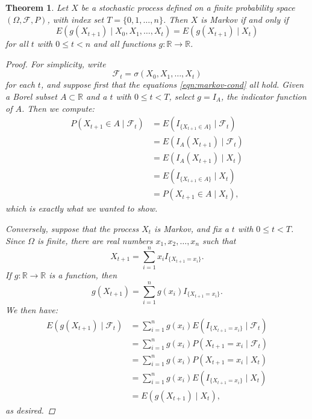 \documentclass[11pt]{book}
\newtheorem{thm}{Theorem}[section]
\theoremstyle{definition}
\numberwithin{equation}{section}
\begin{document}
\begin{thm}
	Let $X$ be a stochastic process defined on a finite probability space $(\Omega, \mathcal{F}, P)$, with index set $T = \{0,1,\ldots,n\}$. Then $X$ is Markov if and only if
	\begin{equation}\label{eqn:markov-cond}
		E\left(g(X_{t+1}) \mid X_0, X_1,\ldots,X_t\right) = E \left( g(X_{t+1}) \mid X_t \right)
	\end{equation}
	for all $t$ with $0\leq t < n$ and all functions $g: \mathbb{R} \to \mathbb{R}$.
	\begin{proof}
		For simplicity, write
		\[
			\mathcal{F}_t = \sigma\left(X_0,X_1,\ldots,X_t \right)
		\]
		for each $t$, and suppose first that the equations \eqref{eqn:markov-cond} all hold. Given a Borel subset $A\subset \mathbb{R}$ and a $t$ with $0\leq t < T$, select $g=I_A$, the indicator function of $A$. Then we compute:
		\begin{align*}
			P\left(X_{t+1} \in A \mid \mathcal{F}_t\right) & = E\left( I_{\{X_{t+1} \in A\}} \mid \mathcal{F}_t \right) \\
			                                               & = E \left( I_A(X_{t+1}) \mid \mathcal{F}_t \right)         \\
			                                               & = E \left( I_A(X_{t+1}) \mid X_t \right)                   \\
			                                               & = E \left( I_{\{X_{t+1} \in A\}} \mid X_t \right)          \\
			                                               & = P\left(X_{t+1} \in A \mid X_t\right),
		\end{align*}
		which is exactly what we wanted to show.

		Conversely, suppose that the process $X_t$ is Markov, and fix a $t$ with $0 \leq t < T$. Since $\Omega$ is finite, there are real numbers $x_1,x_2,\ldots,x_n$ such that
		\[
			X_{t+1} = \sum_{i=1}^n x_i I_{\{X_{t+1} = x_i \}}.
		\]
		If $g: \mathbb{R} \to \mathbb{R}$ is a function, then
		\[
			g(X_{t+1}) = \sum_{i=1}^n g(x_i) I_{\{X_{t+1} = x_i \}}.
		\]
		We then have:
		\begin{align*}
			E \left( g(X_{t+1}) \mid \mathcal{F}_t \right) & = \sum_{i=1}^n g(x_i) E\left(I_{\{X_{t+1} = x_i \}} \mid \mathcal{F}_t \right) \\
			                                               & = \sum_{i=1}^n g(x_i) P\left(X_{t+1} = x_i \mid \mathcal{F}_t \right)          \\
			                                               & = \sum_{i=1}^n g(x_i) P\left(X_{t+1} = x_i \mid X_t \right)                    \\
			                                               & = \sum_{i=1}^n g(x_i) E\left(I_{\{X_{t+1} = x_i \}} \mid X_t \right)           \\
			                                               & = E\left( g(X_{t+1}) \mid X_t \right),
		\end{align*}
		as desired.
	\end{proof}
\end{thm}
\end{document}
